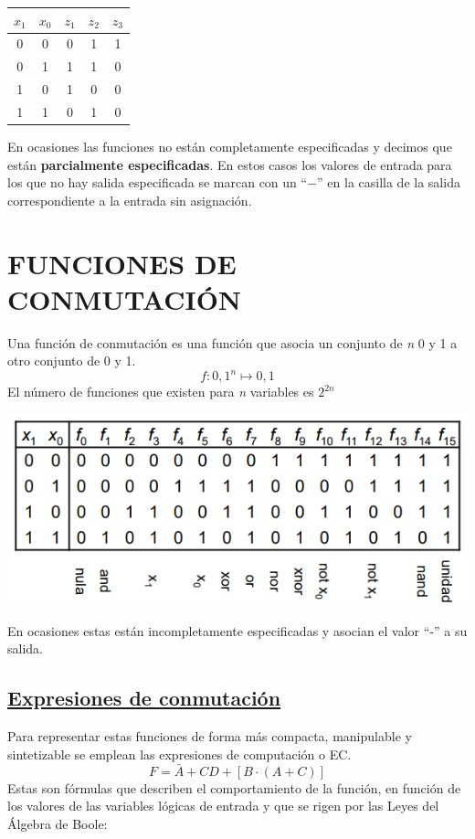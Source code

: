 \documentclass[a4paper,10pt]{book}
\begin{document}
\begin{center}
\begin{tabular}{|c|c|c|c|c|}
\hline
 $x_1$ & $x_0$ & $z_1$ & $z_2$ & $z_3$ \\
 \hline
 0 & 0 & 0 & 1 & 1 \\
 \hline
 0 & 1 & 1 & 1 & 0 \\
 \hline  
 1 & 0 & 1 & 0 & 0 \\
 \hline  
 1 & 1 & 0 & 1 & 0 \\
 \hline  
\end{tabular}\par
\end{center}

En ocasiones las funciones no están completamente especificadas y decimos que están \textbf{parcialmente especificadas}. En estos casos los valores de entrada para los que no hay salida especificada se marcan con un ``$-$'' en la casilla de la salida correspondiente a la entrada sin asignación.

\section*{FUNCIONES DE CONMUTACIÓN}
Una función de conmutación es una función que asocia un conjunto de \textit{n} 0 y 1 a otro conjunto de 0 y 1.
$$f: {0,1}^n \longmapsto {0,1}$$
El número de funciones que existen para \textit{n} variables es $2^{2n}$
\begin{center}
\includegraphics[scale=0.75]{tabla funcion}
\end{center}
En ocasiones estas están incompletamente especificadas y asocian el valor ``-'' a su salida.
\subsection*{\underline{Expresiones de conmutación}}
Para representar estas funciones de forma más compacta, manipulable y sintetizable se emplean las expresiones de computación o EC.
$$F=\bar{A}+CD+[B\cdot(A+C)]$$
Estas son fórmulas que describen el comportamiento de la función, en función de los valores de las variables lógicas de entrada y que se rigen por las Leyes del Álgebra de Boole:
\end{document}
